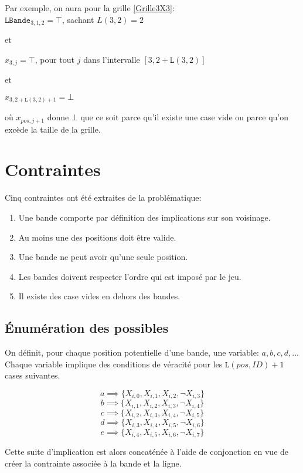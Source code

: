 \documentclass[a4paper,12pt]{report}
\begin{document}
Par exemple, on aura pour la grille \ref{Grille3X3}:\\

$\mathtt{LBande}_{3,1,2} = \top$, sachant $L(3,2) = 2$ 

et

$x_{3,j} = \top$, pour tout $j$ dans l'intervalle $ [3,2+\mathtt{L}(3,2)]$

et

$x_{3,2+\mathtt{L}(3,2)+1} = \bot  $

où $x_{pos,j+1}$ donne $\bot$ que ce soit parce qu'il existe une case vide ou parce qu'on excède la taille de la grille.

\section{Contraintes}

Cinq contraintes ont été extraites de la problématique:
\begin{enumerate}
\item Une bande comporte par définition des implications sur son voisinage.
\item Au moins une des positions doit être valide.
\item Une bande ne peut avoir qu'une seule position.
\item Les bandes doivent respecter l'ordre qui est imposé par le jeu.
\item Il existe des case vides en dehors des bandes.
\end{enumerate}

\subsection{Énumération des possibles}
On définit, pour chaque position potentielle d'une bande, une variable: $a,b,c,d,...$ \\
Chaque variable implique des conditions de véracité pour les $\mathtt{L}(pos,ID)+1$ cases suivantes.

$$a \implies \{X_{i,0},X_{i,1},X_{i,2},\lnot X_{i,3}\}$$
$$b \implies \{X_{i,1},X_{i,2},X_{i,3},\lnot X_{i,4}\}$$
$$c \implies \{X_{i,2},X_{i,3},X_{i,4},\lnot X_{i,5}\}$$
$$d \implies \{X_{i,3},X_{i,4},X_{i,5},\lnot X_{i,6}\}$$
$$e \implies \{X_{i,4},X_{i,5},X_{i,6},\lnot X_{i,7}\}$$

Cette suite d'implication est alors concaténée à l'aide de conjonction en vue de créer la contrainte associée à la bande et la ligne.\\
\end{document}
